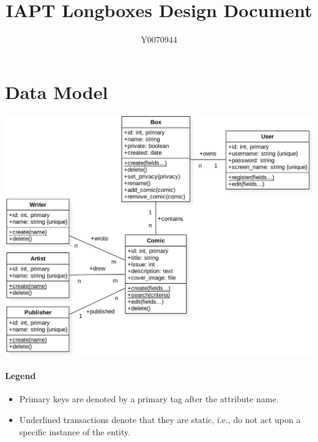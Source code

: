 \documentclass[fontsize=12pt,a4paper]{scrreprt}
\author{Y0070944}
\title{IAPT Longboxes Design Document}
\begin{document}
\maketitle
\setcounter{page}{1}

\chapter{Data Model}


\includegraphics[width=\textwidth]{uml.png}

\subsubsection{Legend}
\begin{itemize}
  \item Primary keys are denoted by a \textsf{primary} tag after the attribute name.
  \item Underlined transactions denote that they are static, i.e., do not act upon a specific instance of the entity.
\end{itemize}
\end{document}
